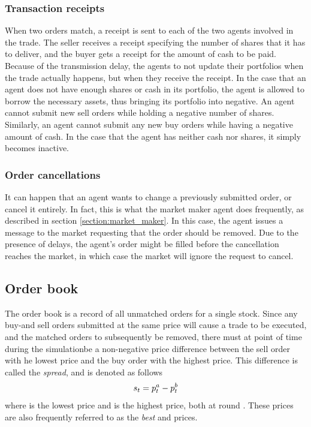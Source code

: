 \subsubsection{Transaction receipts}
When two orders match, a receipt is sent to each of the two agents involved in the trade. The seller receives a receipt specifying the number of shares that it has to deliver, and the buyer gets a receipt for the amount of cash to be paid. Because of the transmission delay, the agents to not update their portfolios when the trade actually happens, but when they receive the receipt. In the case that an agent does not have enough shares or cash in its portfolio, the agent is allowed to borrow the necessary assets, thus bringing its portfolio into negative. An agent cannot submit new sell orders while holding a negative number of shares. Similarly, an agent cannot submit any new buy orders while having a negative amount of cash. In the case that the agent has neither cash nor shares, it simply becomes inactive.

\subsubsection{Order cancellations}
It can happen that an agent wants to change a previously submitted order, or cancel it entirely. In fact, this is what the market maker agent does frequently, as described in section \ref{section:market_maker}. In this case, the agent issues a message to the market requesting that the order should be removed. Due to the presence of delays, the agent's order might be filled before the cancellation reaches the market, in which case the market will ignore the request to cancel.

\subsection{Order book}
The order book is a record of all unmatched orders for a single stock. Since any buy-and sell orders submitted at the same price will cause a trade to be executed, and the matched orders to subsequently be removed, there must at point of time during the simulationbe a non-negative price difference between the sell order with he lowest price and the buy order with the highest price. This difference is called the \textit{spread}, and is denoted as follows
\begin{equation}\label{equation:spread_definition}
s_{t } = p^a_{t } - p^b_{t }
\end{equation}
where \pask{} is the lowest \ask{} price and \pbid{} is the highest \bid{} price, both at round \round. These prices are also frequently referred to as the \textit{best} \ask{} and \bid{} prices.


